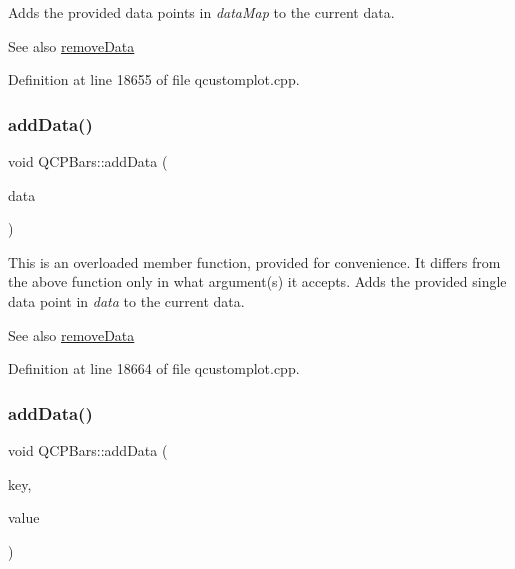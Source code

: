 Adds the provided data points in {\itshape data\+Map} to the current data. \begin{DoxySeeAlso}{See also}
\hyperlink{class_q_c_p_bars_a1fe9bcb57d670defea1bb65cadf43765}{remove\+Data} 
\end{DoxySeeAlso}


Definition at line 18655 of file qcustomplot.\+cpp.

\mbox{\label{class_q_c_p_bars_a142158b1addefd53259002dd3ab22c3a}} 
\subsubsection{\texorpdfstring{add\+Data()}{addData()}\hspace{0.1cm}{\footnotesize\ttfamily [2/4]}}
{\footnotesize\ttfamily void Q\+C\+P\+Bars\+::add\+Data (\begin{DoxyParamCaption}\item[{const \hyperlink{class_q_c_p_bar_data}{Q\+C\+P\+Bar\+Data} \&}]{data }\end{DoxyParamCaption})}

This is an overloaded member function, provided for convenience. It differs from the above function only in what argument(s) it accepts. Adds the provided single data point in {\itshape data} to the current data. \begin{DoxySeeAlso}{See also}
\hyperlink{class_q_c_p_bars_a1fe9bcb57d670defea1bb65cadf43765}{remove\+Data} 
\end{DoxySeeAlso}


Definition at line 18664 of file qcustomplot.\+cpp.

\mbox{\label{class_q_c_p_bars_a684dd105403a5497fda42f2094fecbb7}} 
\subsubsection{\texorpdfstring{add\+Data()}{addData()}\hspace{0.1cm}{\footnotesize\ttfamily [3/4]}}
{\footnotesize\ttfamily void Q\+C\+P\+Bars\+::add\+Data (\begin{DoxyParamCaption}\item[{double}]{key,  }\item[{double}]{value }\end{DoxyParamCaption})}

